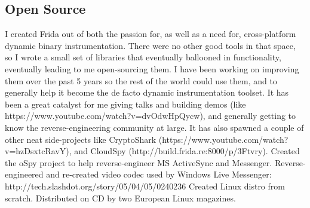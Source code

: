 \documentclass[11pt,a4paper,sans]{moderncv}
\begin{document}
\subsection{Open Source}
{I created Frida out of both the passion for, as well as a need for,
cross-platform dynamic binary instrumentation. There were no other
good tools in that space, so I wrote a small set of libraries that
eventually ballooned in functionality, eventually leading to me
open-sourcing them. I have been working on improving them over the
past 5 years so the rest of the world could use them, and to
generally help it become the de facto dynamic instrumentation
toolset. It has been a great catalyst for me giving talks and
building demos (like https://www.youtube.com/watch?v=dvOdwHpQycw),
and generally getting to know the reverse-engineering community at large.\linebreak
\linebreak
It has also spawned a couple of other neat side-projects like
CryptoShark (https://www.youtube.com/watch?v=hzDsxtcRavY),
and CloudSpy (http://build.frida.re:8000/p/3Ftvry).}
{Created the oSpy project to help reverse-engineer MS ActiveSync and Messenger.}
{Reverse-engineered and re-created video codec used by Windows Live Messenger:
http://tech.slashdot.org/story/05/04/05/0240236}
{Created Linux distro from scratch. Distributed on CD by two European Linux magazines.}

\nocite{*}


\end{document}
